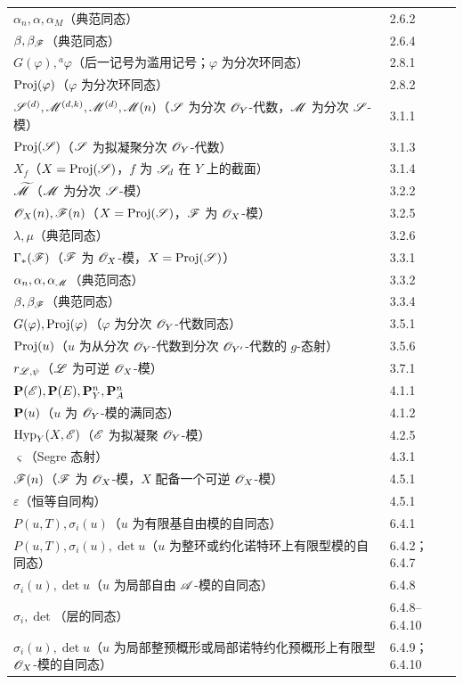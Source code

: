 \begin{longtable}{@{}p{}@{\hspace{1em}}p{}@{}}
$\alpha_n,\alpha,\alpha_M$（典范同态）&2.6.2\\
$\beta,\beta_{\mathscr F}$（典范同态）&2.6.4\\
$G(\varphi),{}^a\varphi$（后一记号为滥用记号；$\varphi$ 为分次环同态）&2.8.1\\
$\operatorname{Proj}(\varphi)$（$\varphi$ 为分次环同态）&2.8.2\\
$\mathscr S^{(d)},\mathscr M^{(d,k)},\mathscr M^{(d)},\mathscr M(n)$（$\mathscr S$ 为分次 $\mathscr O_Y$-代数，$\mathscr M$ 为分次 $\mathscr S$-模）&3.1.1\\
$\operatorname{Proj}(\mathscr S)$（$\mathscr S$ 为拟凝聚分次 $\mathscr O_Y$-代数）&3.1.3\\
$X_f$（$X=\operatorname{Proj}(\mathscr S)$，$f$ 为 $\mathscr S_d$ 在 $Y$ 上的截面）&3.1.4\\
$\widetilde{\mathscr M}$（$\mathscr M$ 为分次 $\mathscr S$-模）&3.2.2\\
$\mathscr O_X(n),\mathscr F(n)$（$X=\operatorname{Proj}(\mathscr S)$，$\mathscr F$ 为 $\mathscr O_X$-模）&3.2.5\\
$\lambda,\mu$（典范同态）&3.2.6\\
$\Gamma_*(\mathscr F)$（$\mathscr F$ 为 $\mathscr O_X$-模，$X=\operatorname{Proj}(\mathscr S)$）&3.3.1\\
$\alpha_n,\alpha,\alpha_{\mathscr M}$（典范同态）&3.3.2\\
$\beta,\beta_{\mathscr F}$（典范同态）&3.3.4\\
$G(\varphi),\operatorname{Proj}(\varphi)$（$\varphi$ 为分次 $\mathscr O_Y$-代数同态）&3.5.1\\
$\operatorname{Proj}(u)$（$u$ 为从分次 $\mathscr O_Y$-代数到分次 $\mathscr O_{Y'}$-代数的 $g$-态射）&3.5.6\\
$r_{\mathscr L,\psi}$（$\mathscr L$ 为可逆 $\mathscr O_X$-模）&3.7.1\\
$\mathbf P(\mathscr E),\mathbf P(E),\mathbf P_Y^n,\mathbf P_A^n$&4.1.1\\
$\mathbf P(u)$（$u$ 为 $\mathscr O_Y$-模的满同态）&4.1.2\\
$\operatorname{Hyp}_Y(X,\mathscr E)$（$\mathscr E$ 为拟凝聚 $\mathscr O_Y$-模）&4.2.5\\
$\varsigma$（Segre 态射）&4.3.1\\
$\mathscr F(n)$（$\mathscr F$ 为 $\mathscr O_X$-模，$X$ 配备一个可逆 $\mathscr O_X$-模）&4.5.1\\
$\varepsilon$（恒等自同构）&4.5.1\\
$P(u,T),\sigma_i(u)$（$u$ 为有限基自由模的自同态）&6.4.1\\
$P(u,T),\sigma_i(u),\det u$（$u$ 为整环或约化诺特环上有限型模的自同态）&6.4.2；6.4.7\\
$\sigma_i(u),\det u$（$u$ 为局部自由 $\mathscr A$-模的自同态）&6.4.8\\
$\sigma_i,\det$（层的同态）&6.4.8--6.4.10\\
$\sigma_i(u),\det u$（$u$ 为局部整预概形或局部诺特约化预概形上有限型 $\mathscr O_X$-模的自同态）&6.4.9；6.4.10\\

\end{longtable}
